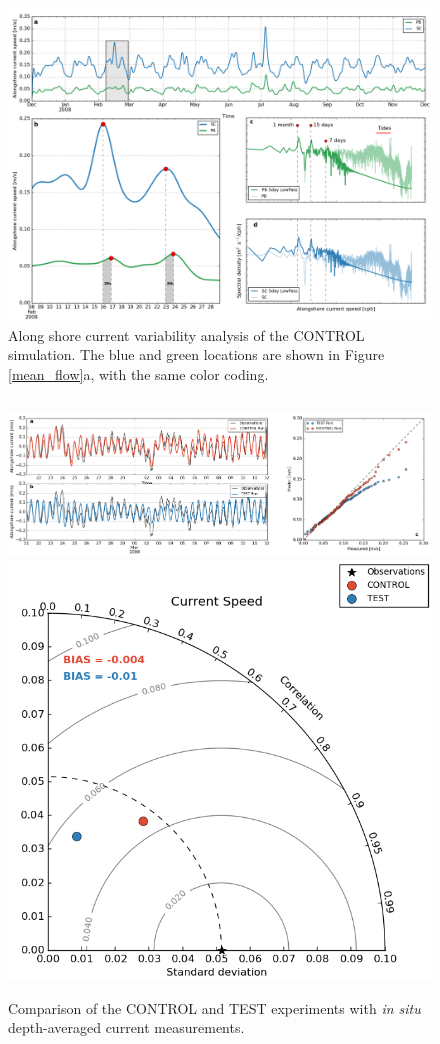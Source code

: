 \documentclass[final]{beamer}
\newlength{\onecolwid}
\newlength{\twocolwid}
\begin{document}
\begin{frame}[t]
\begin{columns}[t]
\begin{column}{\twocolwid}
\begin{columns}[t,totalwidth=\twocolwid]
\begin{column}{\onecolwid}
\begin{block}
            \begin{figure}
            \includegraphics[width=1.0\linewidth]{pb-sc_5day-lowpass_time-series.png}
            \caption{\label{spectra} Along shore current variability analysis of the CONTROL simulation. The blue and green locations are shown in Figure \ref{mean_flow}a, with the same color coding. }
            \end{figure}

            \end{block}


        \end{column} %

    \end{columns} %


    \begin{figure}
    \includegraphics[width=0.73\linewidth]{validation.png}
    \includegraphics[width=0.27\linewidth]{taylor.png}
    \caption{\label{validation} Comparison of the CONTROL and TEST experiments with {\it in situ} depth-averaged current measurements.}
    \end{figure}


\end{column}
\end{columns}
\end{frame}
\end{document}

